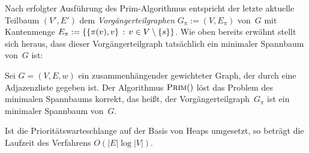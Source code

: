 \begin{bem}
Nach erfolgter Ausführung des Prim-Algorithmus entspricht der letzte aktuelle Teilbaum $(V',E')$ dem \emph{Vorgängerteilgraphen} $G_\pi := (V,E_\pi)$ von~$G$ mit Kantenmenge $E_\pi := \left\{  \{\pi(v),v\} \,:\, v \in V \setminus \{s\} \right\}$.
Wie oben bereits erwähnt stellt sich heraus, dass dieser Vorgängerteilgraph tatsächlich ein minimaler Spannbaum von~$G$ ist:
\end{bem} 

\begin{thm}
\label{thm:prim-korrektheit}
Sei $G=(V,E,w)$ ein zusammenhängender gewichteter Graph, der durch eine Adjazenzliste gegeben ist. 
Der Algorithmus $\mathop{\text{\textsc{Prim}}}()$ löst das Problem des minimalen Spannbaums korrekt, das heißt, der Vorgängerteilgraph~$G_\pi$ ist ein minimaler Spannbaum von~$G$.

Ist die Prioritätswarteschlange auf der Basis von Heaps umgesetzt, so beträgt die Laufzeit des Verfahrens $O(|E| \log |V|)$. 
\end{thm}

